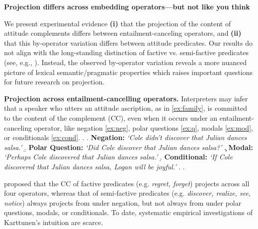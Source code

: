 \documentclass[12pt, letterpaper]{article}
\begin{document}


\begin{center}
	\textbf{\large%
		Projection differs across embedding operators---but not like you think}
\end{center}

\vspace{-.7\baselineskip}
\noindent 
	We present experimental evidence \textbf{(i)} that the projection of the content of attitude complements differs between entailment-canceling operators, and \textbf{(ii)} that this by-operator variation differs between attitude predicates. Our results do not align with the long-standing distinction of factive vs. semi-factive predicates (see, e.g., \citealp{karttunen_observations_1971,hooper_applicability_1973,djarv_cognitive_2018}).
	Instead, the observed by-operator variation reveals a more nuanced picture of lexical semantic/pragmatic properties which raises important questions for future research on projection.

\noindent
	{\bf Projection across entailment-cancelling operators.} Interpreters may infer that a speaker who utters an attitude ascription, as in \ref{ex:family}, is committed to the content of the complement (CC),
	even when it occurs under an entailment-canceling operator, like negation \ref{ex:neg}, polar questions \ref{ex:q}, modals \ref{ex:mod}, or conditionals \ref{ex:cond}.
	\vspace{-.6\baselineskip}
	\ex. \label{ex:family}
		\a. \label{ex:neg}
			{\bf Negation:} \hfill
			\emph{\lq Cole didn't discover that Julian dances salsa.\rq}
		\b. \label{ex:q}
			{\bf Polar Question:} \hfill
			\emph{\lq Did Cole discover that Julian dances salsa?\rq}
		\c. \label{ex:mod}
			{\bf Modal:} \hfill
			\emph{\lq Perhaps Cole discovered that Julian dances salsa.\rq}
		\d. \label{ex:cond}
			{\bf Conditional:} \hfill
			\emph{\lq If Cole discovered that Julian dances salsa, Logan will be joyful.\rq}
		\z.
	\z.

\vspace{-.6\baselineskip}
	\citet{karttunen_observations_1971} proposed that the CC of factive predicates (e.g. \emph{regret, forget}) projects across all four operators, whereas that of semi-factive predicates (e.g. \emph{discover, realize, see, notice}) always projects from under negation, but not always from under polar questions, modals, or conditionals. 
	To date, systematic empirical investigations of Karttunen's intuition are scarce.
\end{document}
